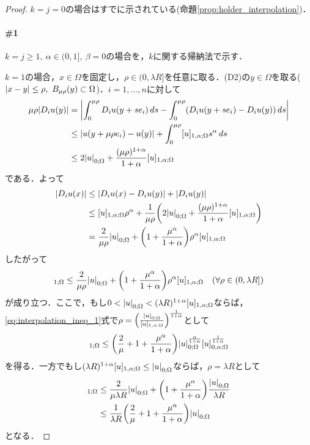 \documentclass[a4paper]{ltjsarticle}
\newcommand{\Om}{\Omega}
\newcommand{\1}{\mathbbm{1}}
\numberwithin{equation}{section}
\theoremstyle{definition}
\begin{document}
\begin{proof}
    $k=j=0$の場合はすでに示されている(命題\ref{prop:holder_interpolation})．
    \paragraph*{\#1}$k=j\geq1,\ \alpha\in(0,1],\ \beta=0$の場合を，$k$に関する帰納法で示す．

    $k=1$の場合，$x\in \Om$を固定し，$\rho\in (0,\lambda R]$を任意に取る．(D2)の$y\in\Om$を取る($\abs{x-y}\leq\rho,\ B_{\mu\rho}(y)\subset \Om$)．$i=1,\ldots,n$に対して
    \begin{align}
        \mu\rho\abs{D_iu(y)}&=\abs{\int_{0}^{\mu\rho}D_iu(y+se_i)\,ds-\int_0^{\mu\rho}(D_iu(y+se_i)-D_iu(y))\,ds}\\
        &\leq \abs{u(y+\mu\rho e_i)-u(y)}+\int_{0}^{\mu\rho}[u]_{1,\alpha;\Om}s^\alpha\,ds\\
        &\leq 2\abs{u}_{0;\Om}+\frac{(\mu\rho)^{1+\alpha}}{1+\alpha}[u]_{1,\alpha;\Om}
    \end{align}
    である．よって
    \begin{align}
        \abs{D_iu(x)}&\leq \abs{D_iu(x)-D_iu(y)}+\abs{D_iu(y)}\\
        &\leq [u]_{1,\alpha;\Om}\rho^{\alpha}+\frac{1}{\mu\rho}\qty(2\abs{u}_{0;\Om}+\frac{(\mu\rho)^{1+\alpha}}{1+\alpha}[u]_{1,\alpha;\Om})\\
        &=\frac{2}{\mu\rho}\abs{u}_{0;\Om}+\qty(1+\frac{\mu^\alpha}{1+\alpha})\rho^\alpha [u]_{1,\alpha;\Om}
    \end{align}
    したがって
    \begin{equation}
        [u]_{1;\Om}\leq \frac{2}{\mu\rho}\abs{u}_{0;\Om}+\qty(1+\frac{\mu^\alpha}{1+\alpha})\rho^\alpha [u]_{1,\alpha;\Om}\quad (\forall \rho\in (0,\lambda R])\label{eq:interpolation_ineq_1}
    \end{equation}
    が成り立つ．ここで，もし$0<\abs{u}_{0;\Om}<(\lambda R)^{1+\alpha}[u]_{1,\alpha;\Om}$ならば，\eqref{eq:interpolation_ineq_1}式で$\rho=\qty(\frac{\abs{u}_{0;\Om}}{[u]_{1,\alpha:\Om}})^{\frac{1}{1+\alpha}}$として
    \begin{equation}
        [u]_{1;\Om}\leq\qty(\frac{2}{\mu}+1+\frac{\mu^\alpha}{1+\alpha})\abs{u}_{0;\Om}^{\frac{\alpha}{1+\alpha}}[u]_{0,\alpha;\Om}^{\frac{1}{1+\alpha}} 
    \end{equation}
    を得る．一方でもし$(\lambda R)^{1+\alpha}[u]_{1,\alpha;\Om}\leq \abs{u}_{0;\Om}$ならば，$\rho=\lambda R$として
    \begin{align}
        [u]_{1;\Om}&\leq \frac{2}{\mu\lambda R}\abs{u}_{0;\Om}+\qty(1+\frac{\mu^\alpha}{1+\alpha})\frac{\abs{u}_{0;\Om}}{\lambda R}\\
        &\leq \frac{1}{\lambda R}\qty(\frac{2}{\mu}+1+\frac{\mu^\alpha}{1+\alpha})\abs{u}_{0;\Om} 
    \end{align}
    となる．


\end{proof}
\end{document}
